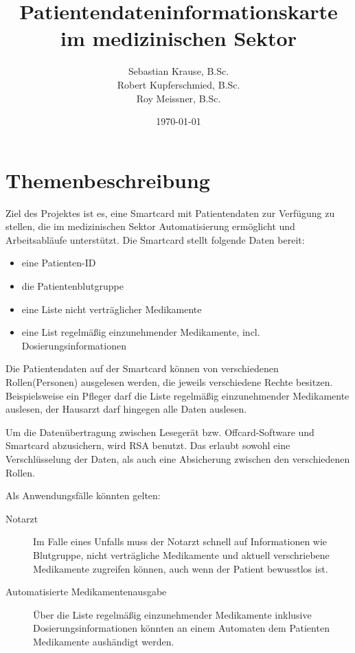 \documentclass[parskip]{scrartcl}
\begin{document}
	\subject{Projektdokumentation im Fach Smartcard-Programmierung}
	\title{Patientendateninformationskarte im medizinischen Sektor}
	\author{Sebastian Krause, B.Sc.\\Robert Kupferschmied, B.Sc.\\Roy Meissner, B.Sc.}
	\date{\today}
	
	\maketitle
	\tableofcontents
	\newpage
	
	\section{Themenbeschreibung}
		Ziel des Projektes ist es, eine Smartcard mit Patientendaten zur Verfügung zu stellen, die im medizinischen Sektor Automatisierung ermöglicht und Arbeitsabläufe unterstützt. Die Smartcard stellt folgende Daten bereit:

		\begin{itemize}
			\item eine Patienten-ID
			\item die Patientenblutgruppe
			\item eine Liste nicht verträglicher Medikamente
			\item eine List regelmäßig einzunehmender Medikamente, incl. Dosierungsinformationen
		\end{itemize}
			
		Die Patientendaten auf der Smartcard können von verschiedenen Rollen(Personen) ausgelesen werden, die jeweils verschiedene Rechte besitzen. Beispielsweise ein Pfleger darf die Liste regelmäßig einzunehmender Medikamente auslesen, der Hausarzt darf hingegen alle Daten auslesen.
		
		Um die Datenübertragung zwischen Lesegerät bzw. Offcard-Software und Smartcard abzusichern, wird RSA benutzt. Das erlaubt sowohl eine Verschlüsselung der Daten, als auch eine Absicherung zwischen den verschiedenen Rollen. 
		
		Als Anwendungsfälle könnten gelten:
	
		\begin{description}
			\item[Notarzt] Im Falle eines Unfalls muss der Notarzt schnell auf Informationen wie Blutgruppe, nicht verträgliche Medikamente und aktuell verschriebene Medikamente zugreifen können, auch wenn der Patient bewusstlos ist. 
			\item[Automatisierte Medikamentenausgabe] Über die Liste regelmäßig einzunehmender Medikamente inklusive Dosierungsinformationen könnten an einem Automaten dem Patienten Medikamente aushändigt werden.
		\end{description}
	
\end{document}
